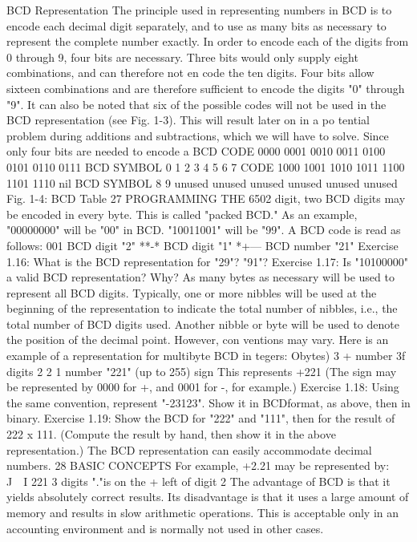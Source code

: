 BCD Representation
The principle used in representing numbers in BCD is to encode
each decimal digit separately, and to use as many bits as necessary
to represent the complete number exactly. In order to encode each
of the digits from 0 through 9, four bits are necessary. Three bits
would only supply eight combinations, and can therefore not en
code the ten digits. Four bits allow sixteen combinations and are
therefore sufficient to encode the digits "0" through "9". It can
also be noted that six of the possible codes will not be used in the
BCD representation (see Fig. 1-3). This will result later on in a po
tential problem during additions and subtractions, which we will
have to solve. Since only four bits are needed to encode a BCD
CODE
0000
0001
0010
0011
0100
0101
0110
0111
BCD
SYMBOL
0
1
2
3
4
5
6
7
CODE
1000
1001
1010
1011
1100
1101
1110
nil
BCD
SYMBOL
8
9
unused
unused
unused
unused
unused
unused
Fig. 1-4: BCD Table
27
PROGRAMMING THE 6502
digit, two BCD digits may be encoded in every byte. This is called
"packed BCD."
As an example, "00000000" will be "00" in BCD. "10011001"
will be "99".
A BCD code is read as follows:
001
BCD digit "2" **-*
BCD digit "1" *+—
BCD number "21"
Exercise 1.16: What is the BCD representation for "29"? "91"?
Exercise 1.17: Is "10100000" a valid BCD representation? Why?
As many bytes as necessary will be used to represent all BCD
digits. Typically, one or more nibbles will be used at the beginning
of the representation to indicate the total number of nibbles, i.e.,
the total number of BCD digits used. Another nibble or byte will
be used to denote the position of the decimal point. However, con
ventions may vary.
Here is an example of a representation for multibyte BCD in
tegers:
Obytes) 3 +
number
3f digits
2 2 1
number "221"
(up to 255) sign
This represents +221
(The sign may be represented by 0000 for +, and 0001 for -, for
example.)
Exercise 1.18: Using the same convention, represent "-23123". Show
it in BCDformat, as above, then in binary.
Exercise 1.19: Show the BCD for "222" and "111", then for the result
of 222 x 111. (Compute the result by hand, then show it in the above
representation.)
The BCD representation can easily accommodate decimal
numbers.
28
BASIC CONCEPTS
For example, +2.21 may be represented by:
J~\ I 221
3 digits "."is on the +
left of digit 2
The advantage of BCD is that it yields absolutely correct
results. Its disadvantage is that it uses a large amount of memory
and results in slow arithmetic operations. This is acceptable only
in an accounting environment and is normally not used in other
cases.
